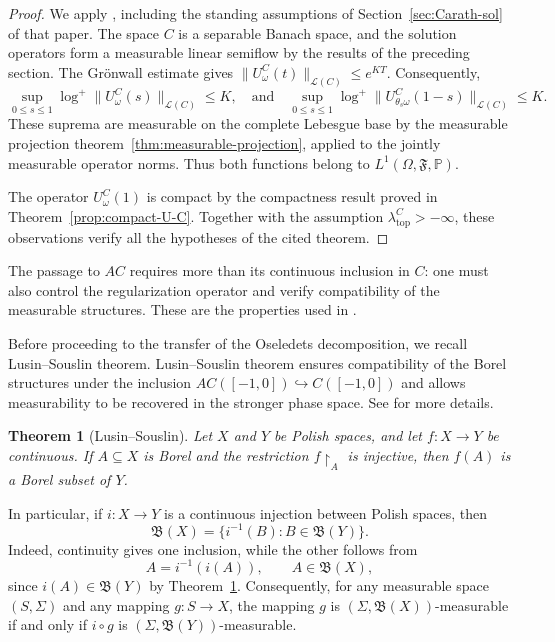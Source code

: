 \documentclass[reqno]{amsart}
\theoremstyle{plain}
\newtheorem{theorem}{Theorem}[section]
\numberwithin{equation}{section}
\numberwithin{definition}{section}
\begin{document}
\begin{proof}
We apply \cite[Theorem~3.4]{MierczynskiNovoObaya2020},
including the standing assumptions of Section~\ref{sec:Carath-sol}
of that paper. The space $C$ is a separable Banach space, and the solution
operators form a measurable linear semiflow by the results
of the preceding section.
The Gr{\"o}nwall  estimate gives $  \|U_\omega^C(t)\|_{\mathcal L(C)}
    \leq e^{KT}$. Consequently,
\begin{equation*}
    \sup_{0\leq s\leq1}
    \log^+\|U_\omega^C(s)\|_{\mathcal L(C)} 
    \leq K, \quad\text{and}\quad \sup_{0\leq s\leq1}
    \log^+\|U_{\theta_s\omega}^C(1-s)\|_{\mathcal L(C)}
    \leq K.
\end{equation*}
These suprema are measurable on the complete Lebesgue
base by the measurable projection theorem~\ref{thm:measurable-projection}, applied to
the jointly measurable operator norms.
Thus both functions belong to $L^1(\Omega,\mathfrak F,\mathbb P)$.

The operator $U_\omega^C(1)$ is compact by the compactness
result proved in Theorem~\ref{prop:compact-U-C}. Together with the assumption
$\lambda_{\mathrm{top}}^C>-\infty$, these observations
verify all the hypotheses of the cited theorem.
\end{proof}

The passage to $AC$ requires more than its continuous
inclusion in $C$: one must also control the regularization
operator and verify compatibility of the measurable
structures. These are the properties used
in \cite[Theorem~3.6]{Kryspin2024}.

Before proceeding to the transfer of the Oseledets decomposition, we recall Lusin--Souslin theorem. Lusin--Souslin theorem ensures
compatibility of the Borel structures under the inclusion
$AC([-1,0])\hookrightarrow C([-1,0])$ and allows measurability
to be recovered in the stronger phase space. See \cite[Theorem~15.1]{Kechris1995} for more details. 

\begin{theorem}[Lusin--Souslin]
\label{thm:lusin-souslin}
Let $X$ and $Y$ be Polish spaces, and let $f:X\to Y$ be
continuous. If $A\subseteq X$ is Borel and the restriction
$f{\restriction}_A$ is injective, then $f(A)$ is a Borel subset of $Y$.
\end{theorem}
In particular, if $i:X\to Y$ is a continuous injection between
Polish spaces, then
\begin{equation*}
    \mathfrak B(X)
    =
    \{i^{-1}(B):B\in \mathfrak B(Y)\}.
\end{equation*}
Indeed, continuity gives one inclusion, while the other follows
from
\begin{equation*}
    A=i^{-1}(i(A)),
    \qquad A\in \mathfrak B(X),
\end{equation*}
since $i(A)\in \mathfrak B(Y)$ by
Theorem~\ref{thm:lusin-souslin}.
Consequently, for any measurable space $(S,\Sigma)$ and any
mapping $g:S\to X$, the mapping $g$ is
$(\Sigma, \mathfrak B(X))$-measurable if and only if $i\circ g$
is $(\Sigma, \mathfrak B(Y))$-measurable.
\end{document}
